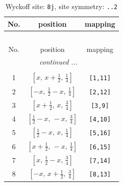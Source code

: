 \documentclass[fleqn,8pt]{jsarticle}
\begin{document}
\begin{longtable}{ccc}
\caption{Wyckoff site: {\tt 8j}, site symmetry: {\tt ..2}}
 \\
 \hline \hline
No. & position & mapping \\ \hline \endfirsthead

\multicolumn{2}{l}{\tablename\ \thetable{}} \\
 \hline \hline
No. & position & mapping \\ \hline \endhead

 \hline \hline
\multicolumn{2}{r}{\footnotesize\it continued ...} \\ \endfoot

 \hline \hline
\multicolumn{2}{r}{} \\ \endlastfoot

1 & $\left[ x,\, x + \frac{1}{2},\, \frac{1}{4} \right]$ & {\tt [1,11]} \\ \hline
2 & $\left[ - x,\, \frac{1}{2} - x,\, \frac{1}{4} \right]$ & {\tt [2,12]} \\ \hline
3 & $\left[ x + \frac{1}{2},\, x,\, \frac{3}{4} \right]$ & {\tt [3,9]} \\ \hline
4 & $\left[ \frac{1}{2} - x,\, - x,\, \frac{3}{4} \right]$ & {\tt [4,10]} \\ \hline
5 & $\left[ \frac{1}{2} - x,\, x,\, \frac{1}{4} \right]$ & {\tt [5,16]} \\ \hline
6 & $\left[ x + \frac{1}{2},\, - x,\, \frac{1}{4} \right]$ & {\tt [6,15]} \\ \hline
7 & $\left[ x,\, \frac{1}{2} - x,\, \frac{3}{4} \right]$ & {\tt [7,14]} \\ \hline
8 & $\left[ - x,\, x + \frac{1}{2},\, \frac{3}{4} \right]$ & {\tt [8,13]} \\
\end{longtable}
\renewcommand{\arraystretch}{1.2}
\end{document}
